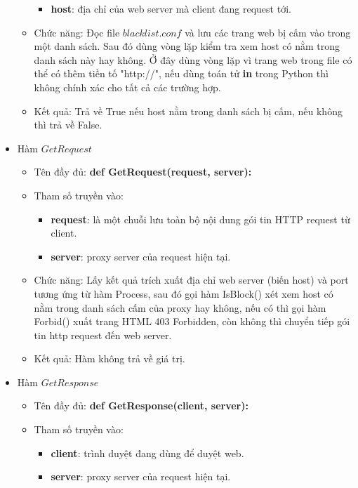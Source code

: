 \documentclass[12pt,a4paper]{article}
\begin{document}
\begin{itemize}
\begin{itemize}
							\begin{itemize}
								\item \textbf{host}: địa chỉ của web server mà client đang request tới.
							\end{itemize}
						\item Chức năng: Đọc file $blacklist.conf$ và lưu các trang web bị cấm vào trong một danh sách. Sau đó dùng vòng lặp kiểm tra xem host có nằm trong danh sách này hay không. Ở đây dùng vòng lặp vì trang web trong file có thể có thêm tiền tố "http://", nếu dùng toán tử \textbf{in} trong Python thì không chính xác cho tất cả các trường hợp.
						\item Kết quả: Trả về True nếu host nằm trong danh sách bị cấm, nếu không thì trả về False.
					\end{itemize}
				\item Hàm $GetRequest$
					\begin{itemize}
						\item Tên đầy đủ: \textbf{def GetRequest(request, server):}
						\item Tham số truyền vào:
							\begin{itemize}
								\item \textbf{request}: là một chuỗi lưu toàn bộ nội dung gói tin HTTP request từ client.
								\item \textbf{server}: proxy server của request hiện tại.
							\end{itemize}
						\item Chức năng: Lấy kết quả trích xuất địa chỉ web server (biến host) và port tương ứng từ hàm Process, sau đó gọi hàm IsBlock() xét xem host có nằm trong danh sách cấm của proxy hay không, nếu có thì gọi hàm Forbid() xuất trang HTML 403 Forbidden, còn không thì chuyển tiếp gói tin http request đến web server.
						\item Kết quả: Hàm không trả về giá trị.
					\end{itemize}
				\item Hàm $GetResponse$
					\begin{itemize}
						\item Tên đầy đủ: \textbf{def GetResponse(client, server):}
						\item Tham số truyền vào:
							\begin{itemize}
								\item \textbf{client}: trình duyệt đang dùng để duyệt web.
								\item \textbf{server}: proxy server của request hiện tại.
							\end{itemize}

\end{itemize}
\end{itemize}
\end{document}
